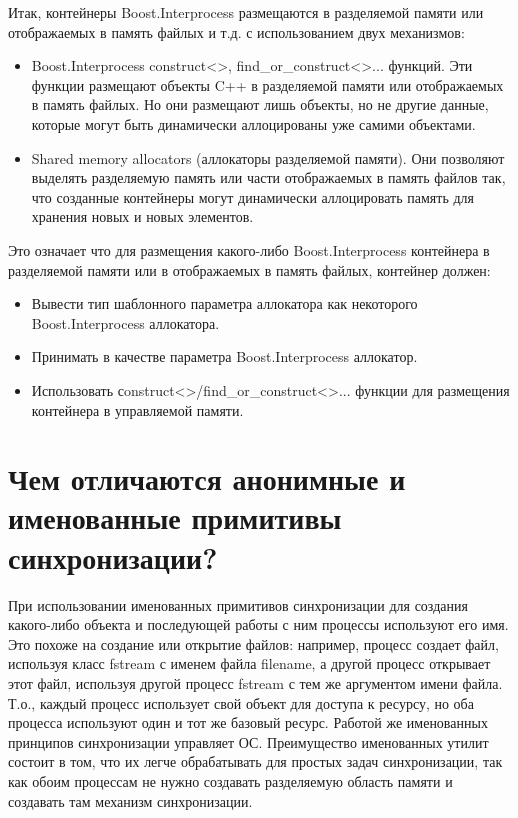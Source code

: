 \documentclass[a4paper,12pt]{article}	%
\begin{document}
	Итак, контейнеры Boost.Interprocess размещаются в разделяемой памяти или отображаемых в память файлых и т.д. с использованием двух механизмов:
	
	\begin{itemize}

		\item Boost.Interprocess construct<>, find\_or\_construct<>... функций. Эти функции размещают объекты C++ в разделяемой памяти или отображаемых в память файлых. Но они размещают лишь объекты, но не другие данные, которые могут быть динамически аллоцированы уже самими объектами.
		
		\item Shared memory allocators (аллокаторы разделяемой памяти). Они позволяют выделять разделяемую память или части отображаемых в память файлов так, что созданные контейнеры могут динамически аллоцировать память для хранения новых и новых элементов.
	
	\end{itemize}
	
	Это означает что для размещения какого-либо Boost.Interprocess контейнера в разделяемой памяти или в отображаемых в память файлых, контейнер должен:

	\begin{itemize}

		\item Вывести тип шаблонного параметра аллокатора как некоторого Boost.Interprocess аллокатора.
		
		\item Принимать в качестве параметра Boost.Interprocess аллокатор.
		
		\item Использовать сonstruct<>/find\_or\_construct<>... функции для размещения контейнера в управляемой памяти.
	
	\end{itemize}
	
\section{Чем отличаются анонимные и именованные примитивы синхронизации?}

	При использовании именованных примитивов синхронизации для создания какого-либо объекта и последующей работы с ним процессы используют его имя. Это похоже на создание или открытие файлов: например, процесс создает файл, используя класс fstream с именем файла filename, а другой процесс открывает этот файл, используя другой процесс fstream с тем же аргументом имени файла. Т.о., каждый процесс использует свой объект для доступа к ресурсу, но оба процесса используют один и тот же базовый ресурс. Работой же именованных принципов синхронизации управляет ОС. Преимущество именованных утилит состоит в том, что их легче обрабатывать для простых задач синхронизации, так как обоим процессам не нужно создавать разделяемую область памяти и создавать там механизм синхронизации.
	
\end{document}
